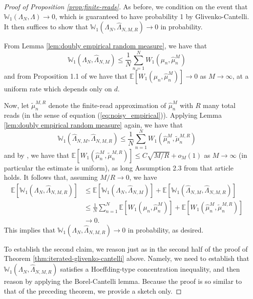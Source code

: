 \documentclass[aos, preprint]{imsart}
\theoremstyle{plain}
\theoremstyle{remark}
\begin{document}
\begin{appendix}
\begin{proof}[Proof of Proposition \ref{prop:finite-reads}]
As before, we condition on the event that $\mathbb{W}_{1}(\Lambda_{N},\Lambda)\rightarrow0$,
which is guaranteed to have probability 1 by Glivenko-Cantelli. It
then suffices to show that $\mathbb{W}_{1}(\Lambda_{N},\hat{\Lambda}_{N,M,R})\rightarrow0$
in probability.

From Lemma \ref{lem:doubly empirical random measure}, we have that
\[
\mathbb{W}_{1}(\Lambda_{N},\hat{\Lambda}_{N,M})\leq\frac{1}{N}\sum_{n=1}^{N}W_{1}(\mu_{n},\hat{\mu}_{n}^{M})
\]
and from Proposition 1.1 of \cite{boissard2014mean} we have that
$\mathbb{E}[W_{1}(\mu_{n},\hat{\mu}_{n}^{M})]\rightarrow0$ as $M\rightarrow\infty$,
at a uniform rate which depends only on $d$.

Now, let $\tilde{\mu}_n^{M,R}$ denote the finite-read approximation of $\hat{\mu}_n^M$ with $R$ many total reads (in the sense of equation (\ref{eq:noisy_empirical})). Applying Lemma \ref{lem:doubly empirical random measure}
again, we have that
\[
\mathbb{W}_{1}(\hat{\Lambda}_{N,M},\hat{\Lambda}_{N,M,R})\leq\frac{1}{N}\sum_{n=1}^{N}W_{1}(\hat{\mu}_{n}^{M},\tilde{\mu}_{n}^{M,R})
\]
and by \cite[Theorem 2.4]{kim2024optimal}, we have that $\mathbb{E}[W_{1}(\hat{\mu}_{n}^{M},\tilde{\mu}_{n}^{M,R})]\leq C\sqrt{M/R}+o_M(1)$
as $M\rightarrow\infty$ (in particular the estimate is uniform), as long
Assumption 2.3 from that article holds. It follows that, assuming $M/R\rightarrow 0$, we have
\begin{align*}
\mathbb{E}\left[\mathbb{W}_{1}(\Lambda_{N},\hat{\Lambda}_{N,M,R})\right] & \leq\mathbb{E}\left[\mathbb{W}_{1}(\Lambda_{N},\hat{\Lambda}_{N,M})\right]+\mathbb{E}\left[\mathbb{W}_{1}(\hat{\Lambda}_{N,M},\hat{\Lambda}_{N,M,R})\right]\\
 & \leq\frac{1}{N}\sum_{n=1}^{N}\mathbb{E}[W_{1}(\mu_{n},\hat{\mu}_{n}^{M})]+\mathbb{E}[W_{1}(\hat{\mu}_{n}^{M},\tilde{\mu}_{n}^{M,R})]\\
 & \rightarrow0.
\end{align*}
This implies that $\mathbb{W}_{1}(\Lambda_{N},\hat{\Lambda}_{N,M,R})\rightarrow0$
in probability, as desired.

To establish the second claim, we reason just as in the second half of the proof of Theorem \ref{thm:iterated-glivenko-cantelli} above. Namely, we need to establish that $\mathbb{W}_1(\Lambda_N,\hat{\Lambda}_{N,M,R})$ satisfies a Hoeffding-type concentration inequality, and then reason by applying the Borel-Cantelli lemma. Because the proof is so similar to that of the preceding theorem, we provide a sketch only.


\end{proof}
\end{appendix}
\end{document}
